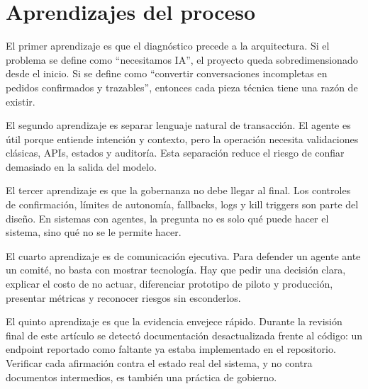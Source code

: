 \section{Aprendizajes del proceso}

El primer aprendizaje es que el diagnóstico precede a la arquitectura. Si el problema se define como ``necesitamos IA'', el proyecto queda sobredimensionado desde el inicio. Si se define como ``convertir conversaciones incompletas en pedidos confirmados y trazables'', entonces cada pieza técnica tiene una razón de existir.

El segundo aprendizaje es separar lenguaje natural de transacción. El agente es útil porque entiende intención y contexto, pero la operación necesita validaciones clásicas, APIs, estados y auditoría. Esta separación reduce el riesgo de confiar demasiado en la salida del modelo.

El tercer aprendizaje es que la gobernanza no debe llegar al final. Los controles de confirmación, límites de autonomía, fallbacks, logs y kill triggers son parte del diseño. En sistemas con agentes, la pregunta no es solo qué puede hacer el sistema, sino qué no se le permite hacer.

El cuarto aprendizaje es de comunicación ejecutiva. Para defender un agente ante un comité, no basta con mostrar tecnología. Hay que pedir una decisión clara, explicar el costo de no actuar, diferenciar prototipo de piloto y producción, presentar métricas y reconocer riesgos sin esconderlos.

El quinto aprendizaje es que la evidencia envejece rápido. Durante la revisión final de este artículo se detectó documentación desactualizada frente al código: un endpoint reportado como faltante ya estaba implementado en el repositorio. Verificar cada afirmación contra el estado real del sistema, y no contra documentos intermedios, es también una práctica de gobierno.
